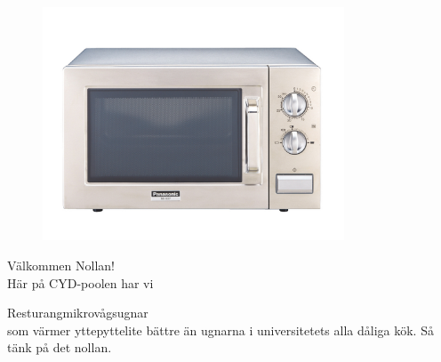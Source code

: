 \documentclass[a4paper,12pt]{article}
\begin{document}
\linespread{2}
\centering

\begin{figure}
  \centering
  \includegraphics[width=0.8\textwidth]{mikro.jpg}
\end{figure}

\mbox{}
\vspace{0.1cm}


\fontsize{30}{20}\selectfont\normalfont
Välkommen Nollan!\\
Här på CYD-poolen har vi

\fontsize{60}{40}\selectfont\normalfont
Resturang\-mikrovågsugnar\\

\vspace{0.8cm}
\fontsize{30}{20}\selectfont\normalfont
som värmer yttepyttelite bättre än ugnarna i universitetets alla dåliga kök. Så tänk på det nollan.
\end{document}
